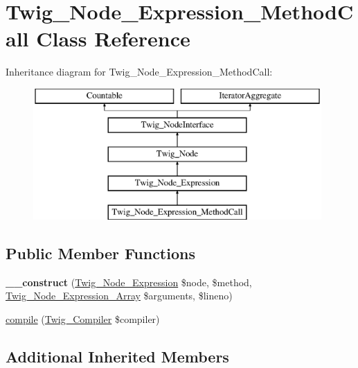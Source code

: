 \hypertarget{classTwig__Node__Expression__MethodCall}{}\section{Twig\+\_\+\+Node\+\_\+\+Expression\+\_\+\+Method\+Call Class Reference}
\label{classTwig__Node__Expression__MethodCall}
Inheritance diagram for Twig\+\_\+\+Node\+\_\+\+Expression\+\_\+\+Method\+Call\+:\begin{figure}[H]
\begin{center}
\leavevmode
\includegraphics[height=5.000000cm]{classTwig__Node__Expression__MethodCall}
\end{center}
\end{figure}
\subsection*{Public Member Functions}
\begin{DoxyCompactItemize}
\item 
{\bfseries \+\_\+\+\_\+construct} (\hyperlink{classTwig__Node__Expression}{Twig\+\_\+\+Node\+\_\+\+Expression} \$node, \$method, \hyperlink{classTwig__Node__Expression__Array}{Twig\+\_\+\+Node\+\_\+\+Expression\+\_\+\+Array} \$arguments, \$lineno)\hypertarget{classTwig__Node__Expression__MethodCall_af6f55fce68b06babc49e79cef6035401}{}\label{classTwig__Node__Expression__MethodCall_af6f55fce68b06babc49e79cef6035401}

\item 
\hyperlink{classTwig__Node__Expression__MethodCall_adcf0553eed0d23ba9a5e66460a5f353d}{compile} (\hyperlink{classTwig__Compiler}{Twig\+\_\+\+Compiler} \$compiler)
\end{DoxyCompactItemize}
\subsection*{Additional Inherited Members}


